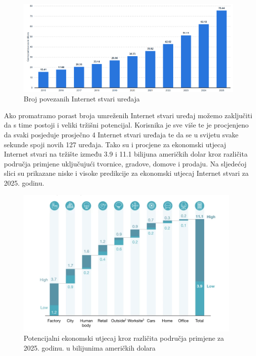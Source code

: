 \documentclass[times, utf8, diplomski]{fer}
\begin{document}
\begin{figure}[htb]
    \centering
    \includegraphics[width=14cm]{images/number-of-installed-iot.png}
    \caption{Broj povezanih Internet stvari uređaja\citep{IotNumber}}
    \label{fig:iotdevices}
\end{figure}
Ako promatramo porast broja umreženih Internet stvari uređaj možemo zaključiti da s time postoji i veliki tržišni potencijal. Korisnika je sve više te je procjenjeno da svaki posjeduje prosječno 4 Internet stvari uređaja te da se u svijetu svake sekunde spoji novih 127 uređaja. Tako su i procjene za ekonomski utjecaj Internet stvari na tržište između 3.9 i 11.1 bilijuna američkih dolar kroz različita područja primjene uključujući tvornice, gradove, domove i prodaju\citep{Patel2018Jan}. Na sljedećoj slici su prikazane niske i visoke predikcije za ekonomski utjecaj Internet stvari za 2025. godinu.

\begin{figure}[htb]
    \centering
    \includegraphics[width=11cm]{images/iot-economic-impact.png}
    \caption{Potencijalni ekonomski utjecaj kroz različita područja primjene za 2025. godinu. u bilijunima američkih dolara\citep{Patel2018Jan}}
    \label{fig:market}
\end{figure}
\end{document}
